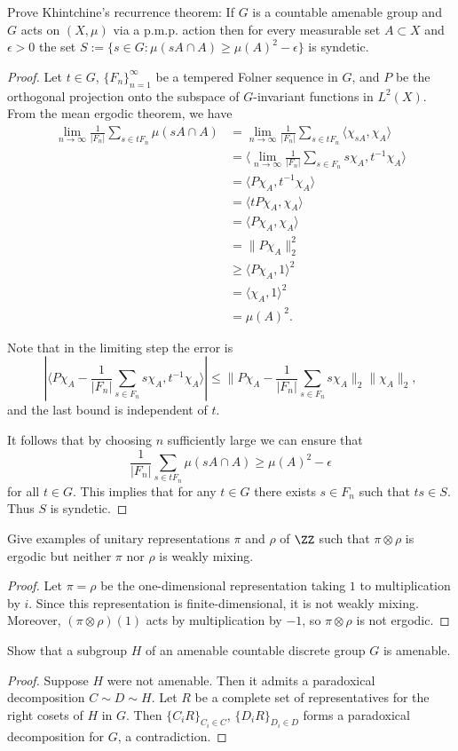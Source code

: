 \documentclass{article}
\begin{document}
 Prove Khintchine's recurrence theorem: If $G$ is a countable amenable group and $G$ acts on $(X,\mu)$ via a p.m.p. action then for every measurable
set $A \subset X$ and $\epsilon > 0$ the set
$S:= \{ s \in G: \mu(sA \cap A) \ge \mu(A)^2 - \epsilon\}$
is syndetic.
\begin{proof}
Let $t \in G$, $\{F_n\}_{n=1}^\infty$ be a tempered Folner sequence in $G$, and $P$ be the orthogonal projection onto the subspace of $G$-invariant functions in $L^2(X)$. From the mean ergodic theorem, we have
\begin{align*}
 \lim_{n \to \infty} \frac 1 {|F_n|} \sum_{s \in tF_n} \mu(sA \cap A) 
& = \lim_{n \to \infty} \frac 1 {|F_n|} \sum_{s \in tF_n} \langle  \chi_{sA}, \chi_{A} \rangle \\
& =  \langle \lim_{n \to \infty} \frac 1 {|F_n|} \sum_{s \in F_n}  s \chi_{A}, t^{-1} \chi_{A} \rangle \\
& = \langle P \chi_{A} , t^{-1} \chi_{A} \rangle \\
& = \langle t P \chi_{A} , \chi_{A} \rangle \\
& = \langle P \chi_{A} , \chi_{A} \rangle \\
& = \|P\chi_A\|_2^2 \\
& \ge \langle P\chi_A, 1 \rangle ^2 \\
& = \langle \chi_A, 1 \rangle ^2 \\
& = \mu(A)^2.
\end{align*}

Note that in the limiting step the error is 
$$
|\langle P \chi_{A} - \frac 1 {|F_n|} \sum_{s \in F_n}  s \chi_{A}, t^{-1} \chi_{A} \rangle| \le \|P \chi_{A} - \frac 1 {|F_n|} \sum_{s \in F_n}  s \chi_{A}\|_2 \|\chi_{A}\|_2,
$$
and the last bound is independent of $t$.

It follows that by choosing $n$ sufficiently large we can ensure that 
$$\frac 1 {|F_n|} \sum_{s \in tF_n} \mu(sA \cap A) \ge \mu(A)^2 - \epsilon$$
for all $t \in G$. This implies that for any $t \in G$ there exists $s \in F_n$ such that $ts \in S$. Thus $S$ is syndetic.
\end{proof}

 Give examples of unitary representations $\pi$ and $\rho$ of $\ZZ$ such that $\pi \otimes \rho$ is ergodic but neither $\pi$ nor $\rho$ is weakly mixing.
\begin{proof}
Let $\pi = \rho$ be the one-dimensional representation taking $1$ to multiplication by $i$.  Since this representation is finite-dimensional, it is not weakly mixing. Moreover, $(\pi \otimes \rho)(1)$ acts by multiplication by $-1$, so $\pi \otimes \rho$ is not ergodic.
\end{proof}

 Show that a subgroup $H$ of an amenable countable discrete group $G$ is amenable.
\begin{proof}
Suppose $H$ were not amenable.  Then it admits a paradoxical decomposition $C \sim D \sim H$. Let $R$ be a complete set of representatives for the right cosets of $H$ in $G$. Then $\{C_iR\}_{C_i \in C}$, $\{D_iR\}_{D_i \in D}$ forms a paradoxical decomposition for $G$, a contradiction.
\end{proof}
\end{document}
